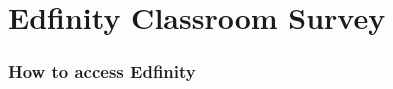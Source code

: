 \documentclass[slidestop,compress,mathserif]{beamer}
\begin{document}

\section{Edfinity Classroom Survey}

\begin{frame}
	\frametitle{How to access Edfinity} %
\end{frame}





\end{document}
